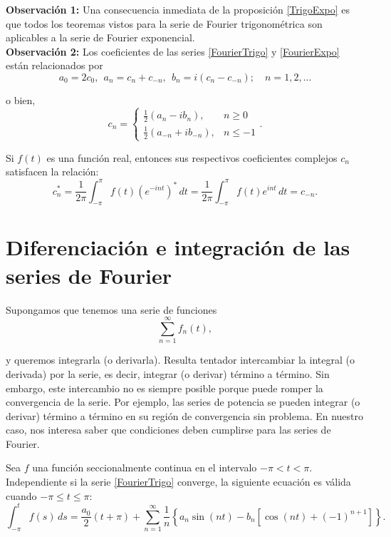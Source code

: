 \textbf{Observación 1:} Una consecuencia inmediata de la proposición \ref{TrigoExpo} es que todos los teoremas vistos para la serie de Fourier trigonométrica son aplicables a la serie de Fourier exponencial.
\\

\textbf{Observación 2:} Los coeficientes de las series \eqref{FourierTrigo} y \eqref{FourierExpo} están relacionados por 
\begin{equation}
a_0 = 2c_0,~~ a_n = c_n + c_{-n}, ~~ b_n = i(c_n - c_{-n}); \quad n = 1,2, \dots    \label{RelacionCoefi1}
\end{equation}

o bien, 
\begin{equation}
    c_n = \left\{ \begin{array}{cl}
        \frac{1}{2} (a_n - ib_n), & n \geq 0  \\
    \frac{1}{2}(a_{-n} + i b_{-n}),     & n  \leq -1 
    \end{array} \right. . \label{RelacionCoefi2}
\end{equation}

Si $f(t)$ es una función real, entonces sus respectivos coeficientes complejos $c_n$ satisfacen la relación:
$$c_n^* = \frac{1}{2\pi} \int_{-\pi}^{\pi} f(t) (e^{-int})^* \,dt = \frac{1}{2\pi} \int_{-\pi}^{\pi} f(t) e^{int} \,dt = c_{-n}.$$

\section{Diferenciación e integración de las series de Fourier}

Supongamos que tenemos una serie de funciones
$$\sum_{n=1}^{\infty} f_n(t),$$

y queremos integrarla (o derivarla). Resulta tentador intercambiar la integral (o derivada) por la serie, es decir, integrar (o derivar) término a término. Sin embargo, este intercambio no es siempre posible porque puede romper la convergencia de la serie. Por ejemplo, las series de potencia se pueden integrar (o derivar) término a término en su región de convergencia sin problema. En nuestro caso, nos interesa saber que condiciones deben cumplirse para las series de Fourier.

\begin{teorema}[Integración]
Sea $f$ una función seccionalmente continua en el intervalo $-\pi < t < \pi$. Independiente si la serie \eqref{FourierTrigo} converge, la siguiente ecuación es válida cuando $-\pi \leq t \leq \pi$:
\begin{equation*}
  \int_{-\pi}^t f(s) \,ds = \frac{a_0}{2} (t + \pi) + \sum_{n=1}^{\infty} \frac{1}{n} \left\{ a_n \sin(nt) - b_n[\cos(nt) + (-1)^{n+1}] \right\}.   
\end{equation*}
\end{teorema}

